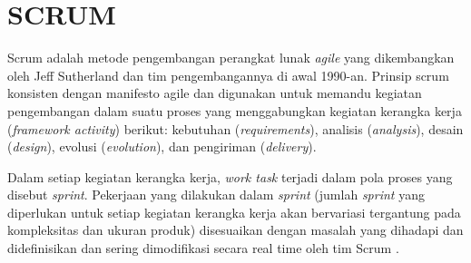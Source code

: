 \section{\uppercase{SCRUM}}

\par Scrum adalah metode pengembangan perangkat lunak \textit{agile} yang dikembangkan oleh Jeff Sutherland dan tim pengembangannya di awal 1990-an. Prinsip scrum konsisten dengan manifesto agile dan digunakan untuk memandu kegiatan pengembangan dalam suatu proses yang menggabungkan kegiatan kerangka kerja (\textit{framework activity}) berikut: kebutuhan (\textit{requirements}), analisis (\textit{analysis}), desain (\textit{design}), evolusi (\textit{evolution}), dan pengiriman (\textit{delivery}).
\par Dalam setiap kegiatan kerangka kerja, \textit{work task} terjadi dalam pola proses yang disebut \textit{sprint}. Pekerjaan yang dilakukan dalam \textit{sprint} (jumlah \textit{sprint} yang diperlukan untuk setiap kegiatan kerangka kerja akan bervariasi tergantung pada kompleksitas dan ukuran produk) disesuaikan dengan masalah yang dihadapi dan didefinisikan dan sering dimodifikasi secara real time oleh tim Scrum \citep{Ereiz2019}.


